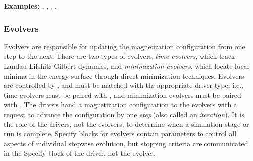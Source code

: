\begin{itemize}
\begin{description}
   \begin{sloppypar}
   \raggedright
   \textbf{Examples:} , ,
                      , .
   \end{sloppypar}

\end{description}
\end{itemize}

\subsubsection{Evolvers\label{sec:oxsEvolvers}}
Evolvers are responsible for updating the magnetization configuration
from one step to the next.  There are two types of evolvers,
\textit{time evolvers}, which track Landau-Lifshitz-Gilbert dynamics,
and \textit{minimization evolvers}, which locate local minima in the
energy surface through direct minimization techniques.  Evolvers are
controlled by , and must be matched with the appropriate
driver type, i.e., time evolvers must be paired with
, and
minimization evolvers must be paired with .  The drivers hand a magnetization
configuration to the evolvers with a request to advance the
configuration by one \textit{step} (also called an \textit{iteration}).
It is the role of the drivers, not the evolvers, to determine when a
simulation stage or run is complete.  Specify blocks for evolvers
contain parameters to control all aspects of individual stepwise
evolution, but stopping criteria are communicated in the Specify block
of the driver, not the evolver.

